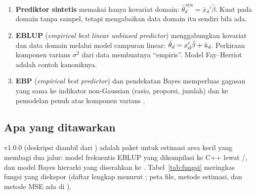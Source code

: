 \begin{enumerate}[label=(\alph*)]
  \item \textbf{Prediktor sintetis} memakai hanya kovariat domain:
        $\hat\theta_d^{\,\mathrm{syn}}=\bar x_d'\hat\beta$. Kuat pada domain
        tanpa sampel, tetapi mengabaikan data domain itu sendiri bila ada.
  \item \textbf{EBLUP} (\emph{empirical best linear unbiased predictor})
        menggabungkan kovariat dan data domain melalui model campuran linear:
        $\hat\theta_d=x_d'\hat\beta+\hat u_d$. Perkiraan komponen varians
        $\sigma^2$ dari data membuatnya ``empiris''. Model Fay--Herriot
        \citep{fay1979small} adalah contoh kanoniknya.
  \item \textbf{EBP} (\emph{empirical best predictor}) dan pendekatan Bayes
        memperluas gagasan yang sama ke indikator non-Gaussian (rasio,
        proporsi, jumlah) dan ke pemodelan penuh atas komponen varians
        \citep{molina2010small, molina2015sae}.
\end{enumerate}

\subsection{Apa yang ditawarkan }

 v1.0.0 (deskripsi diambil dari ) adalah paket
 untuk estimasi area kecil yang membagi dua jalur: model frekuentis
EBLUP yang dikompilasi ke C++ lewat /, dan model
Bayes hierarki yang diserahkan ke . Tabel~\ref{tab:fungsi} meringkas
fungsi yang diekspor (daftar lengkap menurut ; peta file,
metode estimasi, dan metode MSE ada di ).

